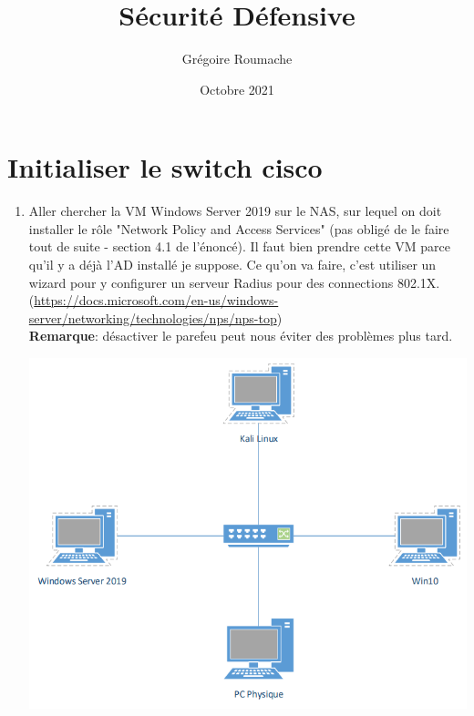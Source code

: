 \documentclass[a4paper]{article}
\title{Sécurité Défensive}
\author{Grégoire Roumache}
\date{Octobre 2021}
\begin{document}
\maketitle \tableofcontents















\section{Initialiser le switch cisco}





\begin{enumerate}

\item Aller chercher la VM Windows Server 2019 sur le NAS, sur lequel on doit installer le rôle "Network Policy and Access Services" (pas obligé de le faire tout de suite - section 4.1 de l'énoncé). Il faut bien prendre cette VM parce qu'il y a déjà l'AD installé je suppose. Ce qu'on va faire, c'est utiliser un wizard pour y configurer un serveur Radius pour des connections 802.1X. \\
(\url{https://docs.microsoft.com/en-us/windows-server/networking/technologies/nps/nps-top}) \\
\textbf{Remarque}: désactiver le parefeu peut nous éviter des problèmes plus tard.

\begin{center} \includegraphics[width=0.75\linewidth]{images/topologie-01.PNG} \end{center}


\end{enumerate}
\end{document}
